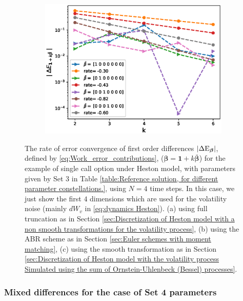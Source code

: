 \documentclass[11pt]{article}
\begin{document}
\begin{figure}[htb]
\begin{subfigure}{0.33\textwidth}
		\includegraphics[width=\linewidth]{./figures/Heston_single_call_smooth_vol/mixed_rates/set4/N_4/first_difference_heston_4steps_spot_hierarchical}
		\caption{}
		\label{fig:3}
	\end{subfigure}
	\caption{The rate of error convergence of first order differences $\left\lvert\Delta \text{E}_{\boldsymbol{\beta}}\right\rvert$, defined by \eqref{eq:Work_error_contributions}, ($\boldsymbol{\beta}=\mathbf{1}+k \bar{\boldsymbol{\beta}}$) for the example of single call option under Heston model, with parameters given by Set $3$ in Table \ref{table:Reference solution, for different parameter constellations.}, using $N=4$ time steps. In this case, we just show  the first  $4$ dimensions which are used for the volatility noise (mainly $dW_v$ in \eqref{eq:dynamics Heston}). (a) using full truncation as in Section \ref{sec:Discretization of Heston model with a non smooth transformations for the volatility process}, (b) using the ABR scheme as in Section \ref{sec:Euler schemes with moment matching}, (c) using the smooth transformation as in Section \ref{sec:Discretization of Heston model with the volatility process Simulated using the sum of  Ornstein-Uhlenbeck (Bessel) processes}.}
	\label{fig:first_diff_Heston_call_N_4_set4}	
\end{figure}
\FloatBarrier
  
\subsubsection*{Mixed differences for the case of Set 4 parameters}
\end{document}
